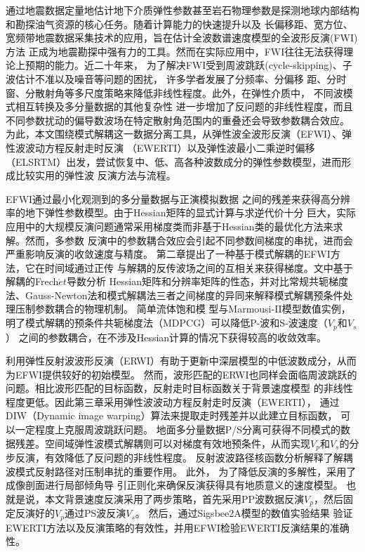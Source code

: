 \begin{cabstract}
	通过地震数据定量地估计地下介质弹性参数甚至岩石物理参数是探测地球内部结构和勘探油气资源的核心任务。随着计算能力的快速提升以及
	长偏移距、宽方位、宽频带地震数据采集技术的应用，旨在估计全波数谱速度模型的全波形反演(FWI)方法
	正成为地震勘探中强有力的工具。然而在实际应用中，FWI往往无法获得理论上预期的能力。近二十年来，
	为了解决FWI受到周波跳跃(cycle-skipping)、子波估计不准以及噪音等问题的困扰，
	许多学者发展了分频率、分偏移
	距、分时窗、分散射角等多尺度策略来降低非线性程度。此外，在弹性介质中，
	不同波模式相互转换及多分量数据的其他复杂性
	进一步增加了反问题的非线性程度，而且
	不同参数扰动的偏导数波场在特定散射角范围内的重叠还会导致参数耦合效应。
	为此，本文围绕模式解耦这一数据分离工具，从弹性波全波形反演（EFWI）、弹性波波动方程反射走时反演
	（EWERTI）以及弹性波最小二乘逆时偏移（ELSRTM）出发，尝试恢复中、低、高各种波数成分的弹性参数模型，进而形成比较实用的弹性波
	反演方法与流程。

	EFWI通过最小化观测到的多分量数据与正演模拟数据
	之间的残差来获得高分辨率的地下弹性参数模型。由于Hessian矩阵的显式计算与求逆代价十分
	巨大，实际应用中的大规模反演问题通常采用梯度类而非基于Hessian类的最优化方法来求解。然而，多参数
	反演中的参数耦合效应会引起不同参数间梯度的串扰，进而会严重影响反演的收敛速度与精度。
	第二章提出了一种基于模式解耦的EFWI方法，它在时间域通过正传
	与解耦的反传波场之间的互相关来获得梯度。文中基于解耦的Frech$\acute{e}t$导数分析
	Hessian矩阵和分辨率矩阵的性态，并对比常规共轭梯度法、Gauss-Newton法和模式解耦法三者之间梯度的异同来解释模式解耦预条件处理压制参数耦合的物理机制。
	简单流体饱和模
	型与Marmousi-II模型数值实例，明了模式解耦的预条件共轭梯度法（MDPCG）可以降低P-波和S-波速度（$V_p$和$V_s$）
	之间的参数耦合，在不涉及Hessian计算的情况下获得较高的收敛效率。

	利用弹性反射波波形反演（ERWI）有助于更新中深层模型的中低波数成分，从而为EFWI提供较好的初始模型。
	然而，波形匹配的ERWI也同样会面临周波跳跃的问题。相比波形匹配的目标函数，反射走时目标函数关于背景速度模型
	的非线性程度更低。因此第三章采用弹性波波动方程反射走时反演（EWERTI），
	通过DIW（Dynamic image warping）算法来提取走时残差并以此建立目标函数，
	可以一定程度上克服周波跳跃问题。
	地面多分量数据P/S分离可获得不同模式的数据残差。空间域弹性波模式解耦则可以对梯度有效地预条件，从而实现$V_p$和$V_s$的分步反演，有效降低了反问题的非线性程度。
	反射波波路径核函数分析解释了解耦波模式反射路径对压制串扰的重要作用。
	此外，
	为了降低反演的多解性，采用了成像剖面进行局部倾角导
	引正则化来确保反演获得具有地质意义的速度模型。
	也就是说，本文背景速度反演采用了两步策略，首先采用PP波数据反演$V_p$，然后固定反演好的$V_p$通过PS波反演$V_s$。
	然后，通过Sigsbee2A模型的数值实验结果
	验证EWERTI方法以及反演策略的有效性，并用EFWI检验EWERTI反演结果的准确性。


\end{cabstract}
